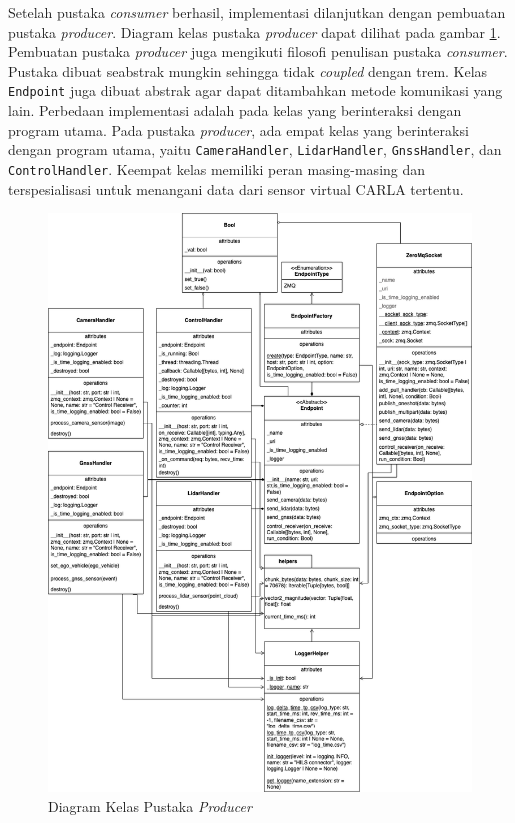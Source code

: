 Setelah pustaka \textit{consumer} berhasil, implementasi dilanjutkan dengan
pembuatan pustaka \textit{producer}. Diagram kelas pustaka \textit{producer}
dapat dilihat pada gambar \ref{chapter-4-producer-class-diagram}. Pembuatan
pustaka \textit{producer} juga mengikuti filosofi penulisan pustaka
\textit{consumer}. Pustaka dibuat seabstrak mungkin sehingga tidak
\textit{coupled} dengan trem. Kelas \texttt{Endpoint} juga dibuat abstrak agar
dapat ditambahkan metode komunikasi yang lain. Perbedaan implementasi adalah
pada kelas yang berinteraksi dengan program utama. Pada pustaka
\textit{producer}, ada empat kelas yang berinteraksi dengan program utama, yaitu
\texttt{CameraHandler}, \texttt{LidarHandler}, \texttt{GnssHandler}, dan
\texttt{ControlHandler}. Keempat kelas memiliki peran masing-masing dan
terspesialisasi untuk menangani data dari sensor virtual CARLA tertentu.
\begin{figure}[!htbp]
	\centering
	\includegraphics[width=1.0\textwidth]{resources/chapter-4/producer-class_diagram.png}
	\caption{Diagram Kelas Pustaka \textit{Producer}}
	\label{chapter-4-producer-class-diagram}
\end{figure}

